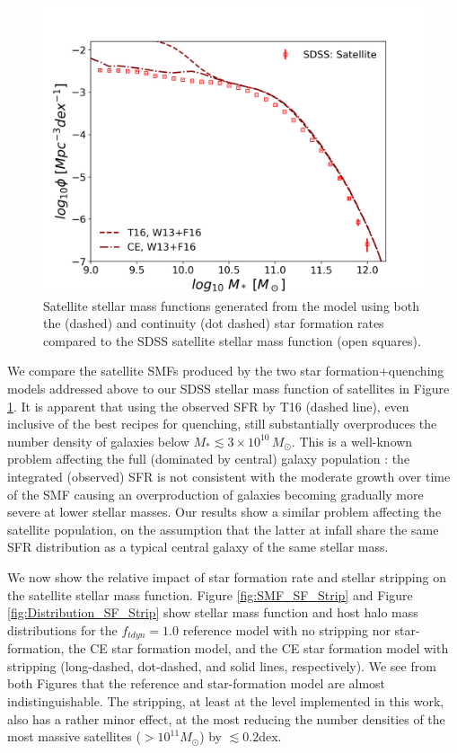 \begin{figure}
	\centering
	\includegraphics[width = \linewidth]{Figures/Chapter3/Fig9.png}
	\caption{Satellite stellar mass functions generated from the model using both the \citet{Tomczak2016THE4} (dashed) and continuity (dot dashed) star formation rates compared to the SDSS satellite stellar mass function (open squares).}
	\label{fig:SMF_SF_Q}
\end{figure}

We compare the satellite SMFs produced by the two star formation+quenching models addressed above to our SDSS stellar mass function of satellites in Figure \ref{fig:SMF_SF_Q}. It is apparent that using the observed SFR by T16 (dashed line), even inclusive of the best recipes for quenching, still substantially overproduces the number density of galaxies below $M_* \lesssim 3\times 10^{10}\, M_{\odot}$. This is a well-known problem affecting the full (dominated by central) galaxy population \citep[e.g.,][]{Leja2015ReconcilingFunction}: the integrated (observed) SFR is not consistent with the moderate growth over time of the SMF causing an overproduction of galaxies becoming gradually more severe at lower stellar masses. Our results show a similar problem affecting the satellite population, on the assumption that the latter at infall share the same SFR distribution as a typical central galaxy of the same stellar mass.


We now show the relative impact of star formation rate and stellar stripping on the satellite stellar mass function. Figure \ref{fig:SMF_SF_Strip} and Figure \ref{fig:Distribution_SF_Strip} show stellar mass function and host halo mass distributions for the $f_{tdyn} = 1.0$ reference model with no stripping nor star-formation, the CE star formation model, and the CE star formation model with stripping (long-dashed, dot-dashed, and solid lines, respectively). We see from both Figures that the reference and star-formation model are almost indistinguishable. The stripping, at least at the level implemented in this work, also has a rather minor effect, at the most reducing the number densities of the most massive satellites ($>10^{11}M_{\odot}$) by $\lesssim 0.2$dex.

